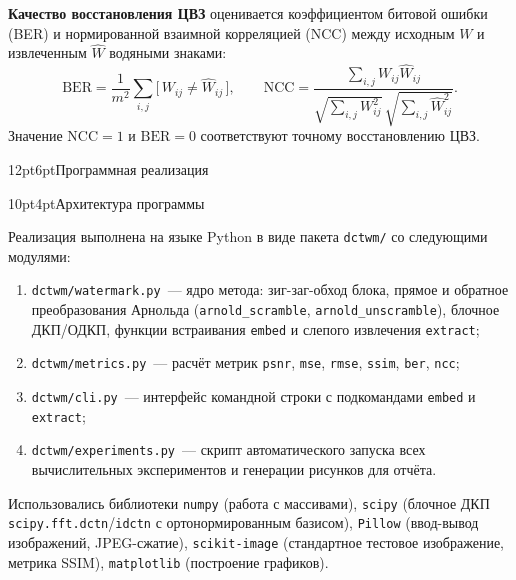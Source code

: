 \documentclass[12pt,a4paper]{article}
\makeatletter
\renewcommand\section{\@startsection{section}{1}{\z@}%
  {12pt}{6pt}{\normalfont\normalsize\bfseries}}
\renewcommand\subsection{\@startsection{subsection}{2}{\z@}%
  {10pt}{4pt}{\normalfont\normalsize\bfseries}}
\makeatother
\begin{document}
\textbf{Качество восстановления ЦВЗ} оценивается коэффициентом битовой ошибки (BER) и нормированной взаимной корреляцией (NCC) между исходным $W$ и извлеченным $\widehat{W}$ водяными знаками:
\begin{equation}
    \mathrm{BER} = \frac{1}{m^2}\sum_{i,j}\bigl[\,W_{ij} \neq \widehat{W}_{ij}\,\bigr], \qquad
    \mathrm{NCC} = \frac{\sum_{i,j} W_{ij}\widehat{W}_{ij}}{\sqrt{\sum_{i,j} W_{ij}^2}\,\sqrt{\sum_{i,j}\widehat{W}_{ij}^2}}.
\end{equation}
Значение $\mathrm{NCC} = 1$ и $\mathrm{BER} = 0$ соответствуют точному восстановлению ЦВЗ.

\section{Программная реализация}

\subsection{Архитектура программы}

Реализация выполнена на языке Python в виде пакета \texttt{dctwm/} со следующими модулями:
\begin{enumerate}
    \item \texttt{dctwm/watermark.py}~--- ядро метода: зиг-заг-обход блока, прямое и обратное преобразования Арнольда (\texttt{arnold\_scramble}, \texttt{arnold\_unscramble}), блочное ДКП/ОДКП, функции встраивания \texttt{embed} и слепого извлечения \texttt{extract};
    \item \texttt{dctwm/metrics.py}~--- расчёт метрик \texttt{psnr}, \texttt{mse}, \texttt{rmse}, \texttt{ssim}, \texttt{ber}, \texttt{ncc};
    \item \texttt{dctwm/cli.py}~--- интерфейс командной строки с подкомандами \texttt{embed} и \texttt{extract};
    \item \texttt{dctwm/experiments.py}~--- скрипт автоматического запуска всех вычислительных экспериментов и генерации рисунков для отчёта.
\end{enumerate}

Использовались библиотеки \texttt{numpy} (работа с массивами), \texttt{scipy} (блочное ДКП \texttt{scipy.fft.dctn}/\texttt{idctn} с ортонормированным базисом), \texttt{Pillow} (ввод-вывод изображений, JPEG-сжатие), \texttt{scikit-image} (стандартное тестовое изображение, метрика SSIM), \texttt{matplotlib} (построение графиков).
\end{document}
